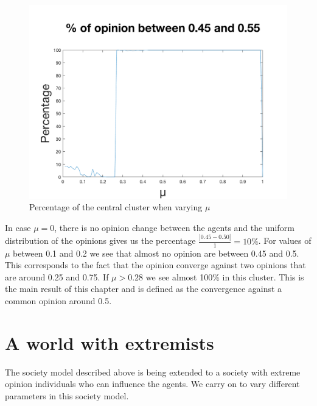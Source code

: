 \documentclass[11pt]{article}
\begin{document}
\begin{figure}[!htb]
\center
  \includegraphics[width=0.7\linewidth]{gen_plot_intervall_2017121418231461579e+01.png}
  \caption{Percentage of the central cluster when varying $\mu$}
  \label{fig:uwithoutextremists}
\end{figure}

In case $\mu = 0$, there is no opinion change between the agents and the uniform distribution of the opinions gives us the percentage $\frac{|0.45-0.50|}{1} = 10\%$. For values of $\mu$ between 0.1 and 0.2 we see that almost no opinion are between 0.45 and 0.5. This corresponds to the fact that the opinion converge against two opinions that are around 0.25 and 0.75. If $\mu > 0.28$ we see almost 100\% in this cluster. This is the main result of this chapter and is defined as the convergence against a common opinion around 0.5.

\section{A world with extremists}
The society model described above is being extended to a society with extreme opinion individuals who can influence the agents. We carry on to vary different parameters in this society model.
\end{document}
